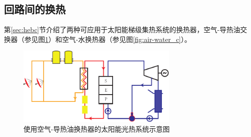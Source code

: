 \subsection{回路间的换热}

第\ref{sec:hebc}节介绍了两种可应用于太阳能梯级集热系统的换热器，空气-导热油交换器（参见图\ref{fig:air-oil_c}）和空气-水换热器（参见图\ref{fig:air-water_c}）。

\begin{figure}[h]
\centering 
\includegraphics[width=0.7\textwidth]{fig/air-oil}
\caption{使用空气-导热油换热器的太阳能光热系统示意图}\label{fig:air-oil_c}
\end{figure}

